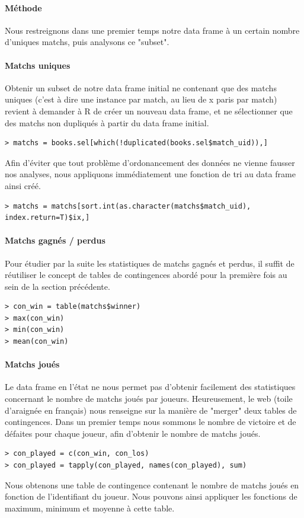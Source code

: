 \documentclass{report}
\begin{document}
\begin{appendices}
\paragraph{Méthode}
Nous restreignons dans une premier temps notre data frame à un certain nombre
d'uniques matchs, puis analysons ce "subset".
\paragraph{Matchs uniques}
Obtenir un subset de notre data frame initial ne contenant que des matchs
uniques (c'est à dire une instance par match, au lieu de x paris par match)
revient à demander à R de créer un nouveau data frame, et ne sélectionner que
des matchs non dupliqués à partir du data frame initial.
\begin{lstlisting}
> matchs = books.sel[which(!duplicated(books.sel$match_uid)),]
\end{lstlisting}
Afin d'éviter que tout problème d'ordonancement des données ne vienne fausser
nos analyses, nous appliquons immédiatement une fonction de tri au data frame
ainsi créé.
\begin{lstlisting}
> matchs = matchs[sort.int(as.character(matchs$match_uid), index.return=T)$ix,]
\end{lstlisting}
\paragraph{Matchs gagnés / perdus}
Pour étudier par la suite les statistiques de matchs gagnés et perdus, il suffit
de réutiliser le concept de tables de contingences abordé pour la première fois
au sein de la section précédente.
\begin{lstlisting}
> con_win = table(matchs$winner)
> max(con_win)
> min(con_win)
> mean(con_win)
\end{lstlisting}
\paragraph{Matchs joués}
Le data frame en l'état ne nous permet pas d'obtenir facilement des statistiques
concernant le nombre de matchs joués par joueurs. Heureusement, le web (toile
d'araignée en français) nous renseigne sur la manière de "merger" deux tables de
contingences. Dans un premier temps nous sommons le nombre de victoire et de
défaites pour chaque joueur, afin d'obtenir le nombre de matchs joués.
\begin{lstlisting}
> con_played = c(con_win, con_los)
> con_played = tapply(con_played, names(con_played), sum)
\end{lstlisting}
Nous obtenons une table de contingence contenant le nombre de matchs joués en
fonction de l'identifiant du joueur. Nous pouvons ainsi appliquer les fonctions
de maximum, minimum et moyenne à cette table. %


\end{appendices}
\end{document}
